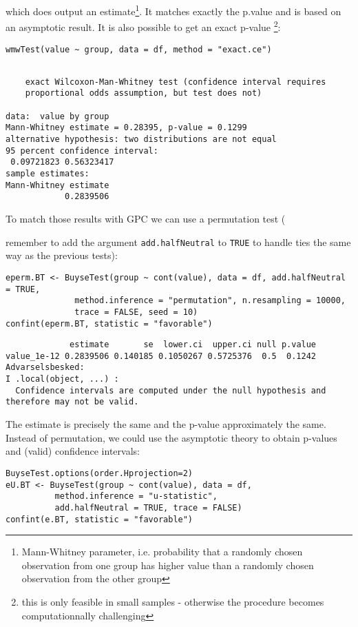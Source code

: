 \documentclass[12pt]{article}
\newcommand\Warning[1][3ex]{%
\renewcommand\stacktype{L}%
\scaleto{\stackon[1.3pt]{\color{red}$\triangle$}{\tiny\bfseries !}}{#1}%
\xspace
}
\begin{document}
which does output an estimate\footnote{Mann-Whitney parameter,
i.e. probability that a randomly chosen observation from one group has
higher value than a randomly chosen observation from the other
group}. It matches exactly the p.value and is based on an asymptotic
result. It is also possible to get an exact p-value \footnote{this is only
feasible in small samples - otherwise the procedure becomes
computationnally challenging}:
\lstset{language=r,label= ,caption= ,captionpos=b,numbers=none}
\begin{lstlisting}
wmwTest(value ~ group, data = df, method = "exact.ce")
\end{lstlisting}

\begin{verbatim}

	exact Wilcoxon-Man-Whitney test (confidence interval requires
	proportional odds assumption, but test does not)

data:  value by group
Mann-Whitney estimate = 0.28395, p-value = 0.1299
alternative hypothesis: two distributions are not equal
95 percent confidence interval:
 0.09721823 0.56323417
sample estimates:
Mann-Whitney estimate 
            0.2839506
\end{verbatim}

To match those results with GPC we can use a permutation test
(\Warning remember to add the argument \texttt{add.halfNeutral} to \texttt{TRUE} to
handle ties the same way as the previous tests):
\lstset{language=r,label= ,caption= ,captionpos=b,numbers=none}
\begin{lstlisting}
eperm.BT <- BuyseTest(group ~ cont(value), data = df, add.halfNeutral = TRUE,
		      method.inference = "permutation", n.resampling = 10000,
		      trace = FALSE, seed = 10)
confint(eperm.BT, statistic = "favorable")
\end{lstlisting}

\begin{verbatim}
             estimate       se  lower.ci  upper.ci null p.value
value_1e-12 0.2839506 0.140185 0.1050267 0.5725376  0.5  0.1242
Advarselsbesked:
I .local(object, ...) :
  Confidence intervals are computed under the null hypothesis and therefore may not be valid.
\end{verbatim}


The estimate is precisely the same and the p-value approximately the
same. Instead of permutation, we could use the asymptotic theory to
obtain p-values and (valid) confidence intervals:
\lstset{language=r,label= ,caption= ,captionpos=b,numbers=none}
\begin{lstlisting}
BuyseTest.options(order.Hprojection=2)
eU.BT <- BuyseTest(group ~ cont(value), data = df,
		  method.inference = "u-statistic",
		  add.halfNeutral = TRUE, trace = FALSE)
confint(e.BT, statistic = "favorable")
\end{lstlisting}
\end{document}
